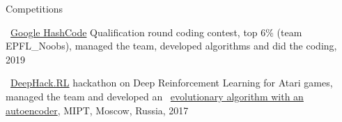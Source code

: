 \documentclass{resume} %
\newcommand*{\img}[1]{%
	\raisebox{-.02\baselineskip}{%
		\texttt{[image: \#1]}%
	}%
}
\newcommand*{\emoji}[1]{\img{./emoji/\imgpref#1.png}}
\newcommand*{\mybold}[1]{{\color{pinkunderline} #1}}
\def\imgpref{bleak-}
\newcommand{\mylink}{{\color{gray}\faExternalLink}}
\begin{document}
\newpage
\begin{rSection}{Competitions}
\vspace{-1em}
\item \emoji{flag-ch} \mylink~\href{https://web.archive.org/web/20190329104357/https://hashcodejudge.withgoogle.com/scoreboard}{Google HashCode} Qualification round coding contest, \mybold{top 6\%} (team EPFL\_Noobs), managed the team, developed algorithms and did the coding, 2019\vspace{1em}\\
\emoji{flag-ru}
\mylink~\href{http://web.archive.org/web/20170224094223/http://rl.deephack.me/}{DeepHack.RL} hackathon on Deep \mybold{Reinforcement} Learning for Atari games, managed the team and developed an \mylink~\href{https://github.com/sergeivolodin/deephack.rl}{evolutionary algorithm with an autoencoder}, MIPT, Moscow, Russia, 2017
\end{rSection}
\end{document}
